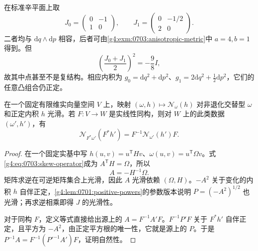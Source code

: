 \begin{example}\label{g4:exm:0703:nonconvex-structures}
	在标准辛平面上取
	\[
		J_0=\begin{pmatrix}0&-1\\1&0\end{pmatrix},\qquad
		J_1=\begin{pmatrix}0&-1/2\\2&0\end{pmatrix}.
	\]
	二者均与 \(\mathrm{d}q\wedge\mathrm{d}p\) 相容，后者可由\cref{g4:exm:0703:anisotropic-metric}中 \(a=4,b=1\) 得到。但
	\[
		\left(\frac{J_0+J_1}{2}\right)^2=-\frac98 I,
	\]
	故其中点甚至不是复结构。相应内积为 \(g_0=\mathrm{d}q^2+\mathrm{d}p^2\)、\(g_1=2\mathrm{d}q^2+\tfrac12\mathrm{d}p^2\)，它们的任意凸组合仍正定。
\end{example}

\begin{lemma}\label{g4:lem:0703:smooth-natural-normalization}
	在一个固定有限维实向量空间 \(V\) 上，映射 \((\omega,h)\mapsto\mathcal N_\omega(h)\) 对非退化交替型 \(\omega\) 和正定内积 \(h\) 光滑。若 \(F:V\to W\) 是实线性同构，则对 \(W\) 上的此类数据 \((\omega',h')\)，有
	\[
		\mathcal N_{F^*\omega'}(F^*h')
		=F^{-1}\mathcal N_{\omega'}(h')F.
	\]
\end{lemma}
\begin{proof}
	在一个固定实基中写 \(h(u,v)=u^{\mathsf T}Hv\)、\(\omega(u,v)=u^{\mathsf T}\Omega v\)。式\eqref{g4:eq:0703:skew-operator}成为 \(A^{\mathsf T}H=\Omega\)，所以
	\[
		A=-H^{-1}\Omega.
	\]
	矩阵求逆在可逆矩阵集合上光滑，因此 \(A\) 光滑依赖 \((\Omega,H)\)。\(-A^2\) 关于变化的内积 \(h\) 自伴正定，\cref{g4:lem:0701:positive-powers}的参数版本说明 \(P=(-A^2)^{1/2}\) 也光滑；再求逆相乘即得 \(J\) 的光滑性。

	对于同构 \(F\)，定义等式直接给出源上的 \(A=F^{-1}A'F\)。\(F^{-1}P'F\) 关于 \(F^*h'\) 自伴正定，且平方为 \(-A^2\)，由正定平方根的唯一性，它就是源上的 \(P\)。于是 \(P^{-1}A=F^{-1}(P'^{-1}A')F\)，证明自然性。
\end{proof}

